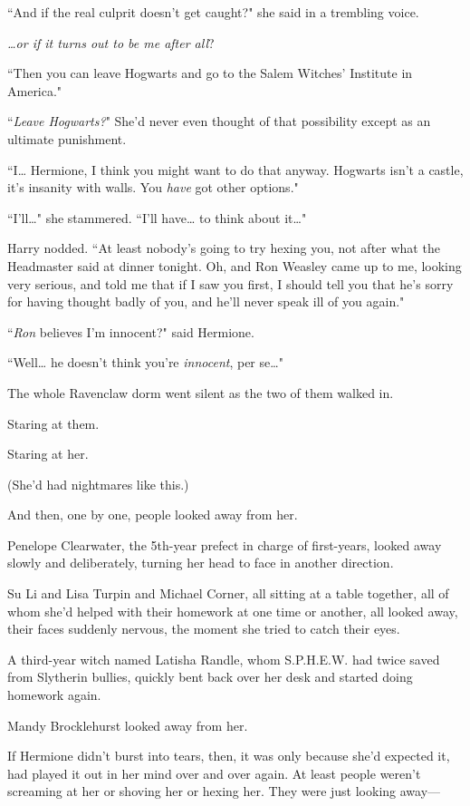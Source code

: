 ``And if the real culprit doesn't get caught?" she said in a trembling voice.

\emph{{\ldots}or if it turns out to be me after all}?

``Then you can leave Hogwarts and go to the Salem Witches' Institute in America."

``\emph{Leave Hogwarts?}" She'd never even thought of that possibility except as an ultimate punishment.

``I{\ldots} Hermione, I think you might want to do that anyway. Hogwarts isn't a castle, it's insanity with walls. You \emph{have} got other options."

``I'll{\ldots}" she stammered. ``I'll have{\ldots} to think about it{\ldots}"

Harry nodded. ``At least nobody's going to try hexing you, not after what the Headmaster said at dinner tonight. Oh, and Ron Weasley came up to me, looking very serious, and told me that if I saw you first, I should tell you that he's sorry for having thought badly of you, and he'll never speak ill of you again."

``\emph{Ron} believes I'm innocent?" said Hermione.

``Well{\ldots} he doesn't think you're \emph{innocent}, per se{\ldots}"

\later

The whole Ravenclaw dorm went silent as the two of them walked in.

Staring at them.

Staring at her.

(She'd had nightmares like this.)

And then, one by one, people looked away from her.

Penelope Clearwater, the 5th-year prefect in charge of first-years, looked away slowly and deliberately, turning her head to face in another direction.

Su Li and Lisa Turpin and Michael Corner, all sitting at a table together, all of whom she'd helped with their homework at one time or another, all looked away, their faces suddenly nervous, the moment she tried to catch their eyes.

A third-year witch named Latisha Randle, whom S.P.H.E.W. had twice saved from Slytherin bullies, quickly bent back over her desk and started doing homework again.

Mandy Brocklehurst looked away from her.

If Hermione didn't burst into tears, then, it was only because she'd expected it, had played it out in her mind over and over again. At least people weren't screaming at her or shoving her or hexing her. They were just looking away—

